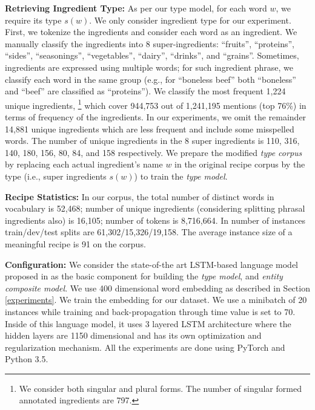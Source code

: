 \documentclass[11pt,a4paper]{article}
\begin{document}
\textbf{Retrieving Ingredient Type:} As per our type model, for each word $w$, we require its type $s(w)$. We only consider ingredient type for our experiment. First, we tokenize the ingredients and consider each word as an ingredient. We manually classify the ingredients into 8 super-ingredients: ``fruits'', ``proteins'', ``sides'', ``seasonings'', ``vegetables'', ``dairy'', ``drinks'', and ``grains''. Sometimes, ingredients are expressed using multiple words; for such ingredient phrase, we classify each word in the same group (e.g., for ``boneless beef'' both ``boneless'' and ``beef'' are classified as ``proteins''). We classify the most frequent 1,224 unique ingredients, \footnote{We consider both singular and plural forms. The number of singular formed annotated ingredients are 797.}  which cover 944,753  out of  1,241,195 mentions (top 76\%) in terms of frequency of the ingredients. In our experiments, we omit the remainder 14,881 unique ingredients which are less frequent and include some misspelled words. The number of unique ingredients in the 8 super ingredients is 110, 316, 140, 180, 156, 80, 84, and  158 respectively.  We prepare the modified {\it type corpus} by replacing each actual ingredient's name $w$ in the original recipe corpus by the type (i.e., super ingredients  $s(w)$) to train the {\it type model}.

 


\textbf{Recipe Statistics:} In our corpus, the total number of distinct words in vocabulary is 52,468; number of unique ingredients (considering splitting  phrasal ingredients also) is 16,105; number of tokens is  8,716,664. In number of instances train/dev/test splits are  61,302/15,326/19,158. The average instance size of a meaningful recipe is 91 on the corpus. 

\textbf{Configuration:} \label{config}
We consider the state-of-the art LSTM-based language model proposed in \cite{socher} as the basic component for building the {\it type model}, and {\it entity composite model}.
We use 400 dimensional word embedding as described in Section \ref{experiments}. We train the embedding for our dataset. We use a minibatch of 20 instances while training and  back-propagation through time value is set to 70. Inside of this \cite{socher} language model, it uses 3 layered LSTM architecture where the hidden layers are 1150 dimensional and has its own optimization and regularization mechanism. All the experiments are done using PyTorch and Python 3.5.
\end{document}
